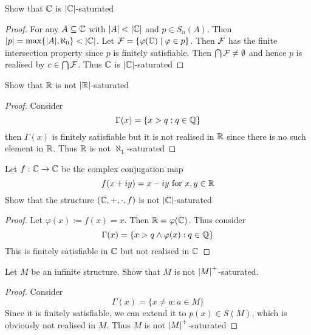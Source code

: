 \documentclass[11pt]{article}
\begin{document}
\begin{exercise}
Show that \(\mathbb{C}\) is \(\abs{\C}\)-saturated
\end{exercise}

\begin{proof}
For any \(A\subseteq\mathbb{C}\) with \(\abs{A}<\abs{\C}\) and \(p\in S_n(A)\).
Then \(\abs{p}=\max\{\abs{A},\aleph_0\}<\abs{\C}\). Let \(\mathcal{F}=\{\varphi(\mathbb{C})\mid\varphi\in p\}\). Then \(\mathcal{F}\) has the finite
intersection property since \(p\) is finitely satisfiable. Then \(\bigcap\mathcal{F}\neq\emptyset\)  and hence \(p\) is
realised by \(c\in\bigcap\mathcal{F}\). Thus \(\mathbb{C}\) is \(\abs{\C}\)-saturated
\end{proof}

\begin{exercise}
Show that \(\mathbb{R}\) is not \(\abs{\R}\)-saturated
\end{exercise}

\begin{proof}
Consider
\begin{equation*}
\Gamma(x)=\{x>q:q\in\mathbb{Q}\}
\end{equation*}
then \(\Gamma(x)\) is finitely satisfiable but it is not realised in \(\mathbb{R}\) since there is no such element
in \(\mathbb{R}\). Thus \(\mathbb{R}\) is not \(\aleph_1\)-saturated
\end{proof}

\begin{exercise}
Let \(f:\mathbb{C}\to\mathbb{C}\) be the complex conjugation map
\begin{equation*}
f(x+iy)=x-iy\text{ for }x,y\in\mathbb{R}
\end{equation*}
Show that the structure \((\mathbb{C},+,\cdot,f)\) is not \(\abs{\C}\)-saturated
\end{exercise}

\begin{proof}
Let \(\varphi(x):=f(x)=x\). Then \(\mathbb{R}=\varphi(\mathbb{C})\). Thus consider
\begin{equation*}
\Gamma(x)=\{x>q\wedge\varphi(x):q\in\mathbb{Q}\}
\end{equation*}
This is finitely satisfiable in \(\mathbb{C}\) but not realised in \(\mathbb{C}\)
\end{proof}

\begin{exercise}
Let \(M\) be an infinite structure. Show that \(M\) is not \(\abs{M}^+\)-saturated.
\end{exercise}

\begin{proof}
Consider
\begin{equation*}
\Gamma(x)=\{x\neq a:a\in M\}
\end{equation*}
Since it is finitely satisfiable, we can extend it to \(p(x)\in S(M)\), which is obviously not
realised in \(M\). Thus \(M\) is not \(\abs{M}^+\)-saturated
\end{proof}
\end{document}
